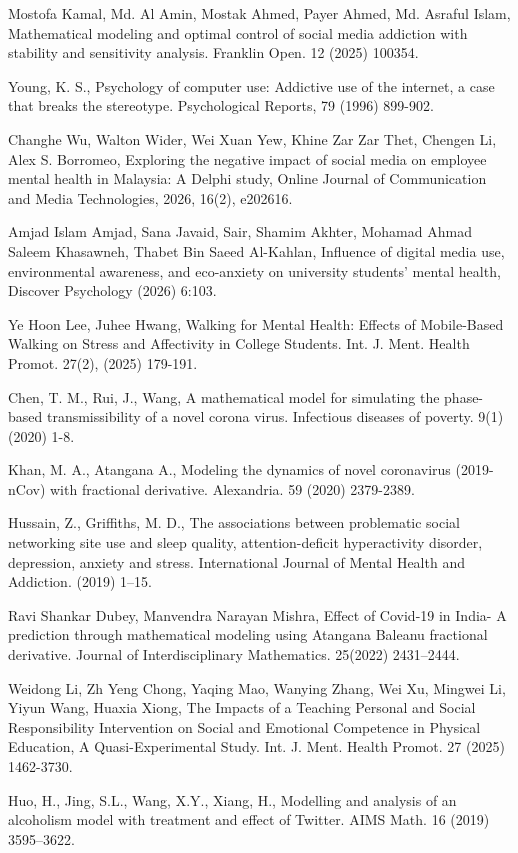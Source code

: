 \documentclass[10pt]{NSP1}
\begin{document}
Mostofa Kamal, Md. Al Amin, Mostak Ahmed, Payer Ahmed, Md. Asraful Islam, Mathematical modeling and optimal control of social media addiction with stability and sensitivity analysis. Franklin Open. 12 (2025) 100354.

Young, K. S., Psychology of computer use: Addictive use of the internet, a case that breaks the stereotype. Psychological Reports, 79 (1996) 899-902.

Changhe Wu, Walton Wider, Wei Xuan Yew, Khine Zar Zar Thet, Chengen Li, Alex S. Borromeo, Exploring the negative impact of social media on employee mental health in Malaysia: A Delphi study, Online Journal of Communication and Media Technologies, 2026, 16(2), e202616.

Amjad Islam Amjad, Sana Javaid, Sair, Shamim Akhter, Mohamad Ahmad Saleem Khasawneh, Thabet Bin Saeed Al-Kahlan, Influence of digital media use, environmental awareness, and eco-anxiety on university students’ mental health, Discover Psychology (2026) 6:103.

Ye Hoon Lee, Juhee Hwang, Walking for Mental Health: Effects of Mobile-Based Walking on Stress and Affectivity in College Students. Int. J. Ment. Health Promot. 27(2), (2025) 179-191.

Chen, T. M., Rui, J., Wang, A mathematical model for simulating the phase-based transmissibility of a novel corona virus. Infectious diseases of poverty. 9(1)(2020) 1-8.

Khan, M. A., Atangana A., Modeling the dynamics of novel coronavirus (2019-nCov) with fractional derivative. Alexandria. 59 (2020) 2379-2389.

Hussain, Z., Griffiths, M. D., The associations between problematic social networking site use and sleep quality, attention-deficit hyperactivity disorder, depression, anxiety and stress. International Journal of Mental Health and Addiction. (2019) 1–15.

Ravi Shankar Dubey, Manvendra Narayan Mishra, Effect of Covid-19 in India- A prediction through mathematical modeling using Atangana Baleanu fractional derivative. Journal of Interdisciplinary Mathematics. 25(2022) 2431–2444.

Weidong Li, Zh Yeng Chong, Yaqing Mao, Wanying Zhang, Wei Xu, Mingwei Li, Yiyun Wang, Huaxia Xiong, The Impacts of a Teaching Personal and Social Responsibility Intervention on Social and Emotional Competence in Physical Education, A Quasi-Experimental Study. Int. J. Ment. Health Promot. 27 (2025) 1462-3730.

Huo, H., Jing, S.L., Wang, X.Y., Xiang, H., Modelling and analysis of an alcoholism model with treatment and effect of Twitter. AIMS Math. 16 (2019) 3595–3622.
\end{document}
